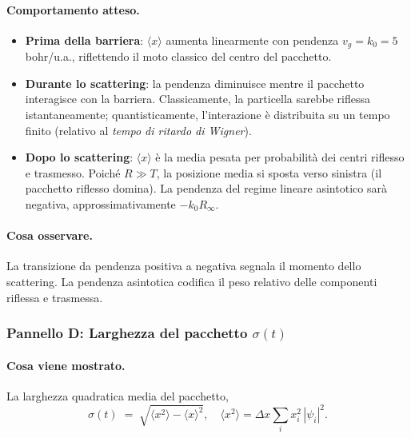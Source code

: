 \documentclass[12pt, a4paper]{article}
\newcommand{\dx}{\Delta x}
\begin{document}
\paragraph{Comportamento atteso.}
\begin{itemize}
  \item \textbf{Prima della barriera}: $\langle x\rangle$ aumenta linearmente
        con pendenza $v_g = k_0 = 5$\,bohr/u.a., riflettendo il moto
        classico del centro del pacchetto.

  \item \textbf{Durante lo scattering}: la pendenza diminuisce mentre il
        pacchetto interagisce con la barriera. Classicamente, la particella
        sarebbe riflessa istantaneamente; quantisticamente, l'interazione
        è distribuita su un tempo finito (relativo al \emph{tempo di ritardo
        di Wigner}).

  \item \textbf{Dopo lo scattering}: $\langle x\rangle$ è la media pesata
        per probabilità dei centri riflesso e trasmesso. Poiché $R \gg T$,
        la posizione media si sposta verso sinistra (il pacchetto riflesso
        domina). La pendenza del regime lineare asintotico sarà negativa,
        approssimativamente $-k_0 R_\infty$.
\end{itemize}

\paragraph{Cosa osservare.}
La transizione da pendenza positiva a negativa segnala il momento dello
scattering. La pendenza asintotica codifica il peso relativo delle
componenti riflessa e trasmessa.

\subsubsection{Pannello D: Larghezza del pacchetto $\sigma(t)$}

\paragraph{Cosa viene mostrato.}
La larghezza quadratica media del pacchetto,
\begin{equation}
  \sigma(t) \;=\; \sqrt{\langle x^2\rangle - \langle x\rangle^2},
  \quad
  \langle x^2\rangle = \dx\sum_i x_i^2\,|\psi_i|^2.
\end{equation}
\end{document}
